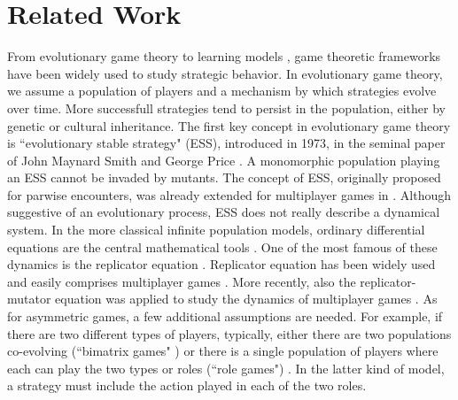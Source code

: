 \documentclass[11pt]{article}
\theoremstyle{plainCl1}
\theoremstyle{plainCl2}
\begin{document}

\section*{Related Work}


From evolutionary game theory \cite{Maynard-Smith:Nature:1973, Maynard-Smith:book:1982, Hofbauer:book:1998, Nowak:book:2006} to learning models \cite{Sandholm:BioSys:1996, Fudenberg:book:1998b, Macy:PNAS:2002, Pangallo:GEB:2022}, game theoretic frameworks have been widely used to study strategic behavior. 
In evolutionary game theory, we assume a population of players and a mechanism by which strategies evolve over time. More successfull strategies tend to persist in the population, either by genetic or cultural inheritance. The first key concept in evolutionary game theory is ``evolutionary stable strategy" (ESS),  introduced in 1973, in the seminal paper of John Maynard Smith and George Price \cite{Maynard-Smith:Nature:1973}. A monomorphic population playing an ESS cannot be invaded by mutants. The concept of ESS, originally proposed for parwise encounters, was already extended for multiplayer games in \cite{Palm:JMB:1984, Broom:BMB:1997, Bukowski:IJGT:2004}. Although suggestive of an evolutionary process, ESS does not really describe a dynamical system. In the more classical infinite population models, ordinary differential equations are the central mathematical tools \cite{Hofbauer:book:1998}. One of the most famous of these dynamics is the replicator equation \cite{Taylor:MB:1978, Hofbauer:book:1998}. Replicator equation has been widely used and easily comprises multiplayer games \cite{Hauert:JTB:2006a, gokhale:PNAS:2010, Pena:Evolution:2011, Cressman:PNAS:2014, Pena:JTB:2014}. More recently, also the replicator-mutator equation was applied to study the dynamics of multiplayer games \cite{Duong:DGAA:2020}. As for asymmetric games, a few additional assumptions are needed. For example, if there are two different types of players, typically, either there are two populations co-evolving (``bimatrix games" \cite{Hofbauer:book:1998, Tuyls:SciRep:2018}) or there is a single population of players where each can play the two types or roles (``role games") \cite{Hofbauer:book:1998}. In the latter kind of model, a strategy must include the action played in each of the two roles. 
\end{document}
